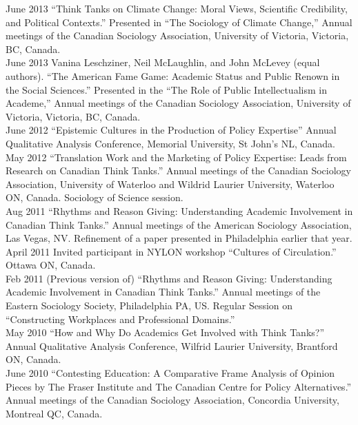 \documentclass[9pt,usenames,dvipsnames]{article}
\begin{document}
\ind June 2013 ``Think Tanks on Climate Change: Moral Views, Scientific Credibility, and Political Contexts.'' Presented in ``The Sociology of Climate Change,'' Annual meetings of the Canadian Sociology Association, University of Victoria, Victoria, BC, Canada. \\

\ind June 2013 Vanina Leschziner, Neil McLaughlin, and John McLevey (equal authors). ``The American Fame Game: Academic Status and Public Renown in the Social Sciences.'' Presented in the ``The Role of Public Intellectualism in Academe,'' Annual meetings of the Canadian Sociology Association, University of Victoria, Victoria, BC, Canada. \\

\ind June 2012 ``Epistemic Cultures in the Production of Policy Expertise'' Annual Qualitative Analysis Conference, Memorial University, St John's NL, Canada.\\

\ind May 2012 ``Translation Work and the Marketing of Policy Expertise: Leads from Research on Canadian Think Tanks.'' Annual meetings of the Canadian Sociology Association, University of Waterloo and Wildrid Laurier University, Waterloo ON, Canada. Sociology of Science session.\\

\ind Aug 2011 ``Rhythms and Reason Giving: Understanding Academic Involvement in Canadian Think Tanks.'' Annual meetings of the American Sociology Association, Las Vegas, NV. Refinement of a paper presented in Philadelphia earlier that year. \\

\ind April 2011 Invited participant in NYLON workshop ``Cultures of Circulation.'' Ottawa ON, Canada.\\

\ind Feb 2011 (Previous version of) ``Rhythms and Reason Giving: Understanding Academic Involvement in Canadian Think Tanks.'' Annual meetings of the Eastern Sociology Society, Philadelphia PA, US. Regular Session on ``Constructing Workplaces and Professional Domains.''\\

\ind May 2010 ``How and Why Do Academics Get Involved with Think Tanks?'' Annual Qualitative Analysis Conference, Wilfrid Laurier University, Brantford ON, Canada.\\

\ind June 2010 ``Contesting Education: A Comparative Frame Analysis of Opinion Pieces by The Fraser Institute and The Canadian Centre for Policy Alternatives.'' Annual meetings  of the Canadian Sociology Association, Concordia University, Montreal QC, Canada.\\
\end{document}
